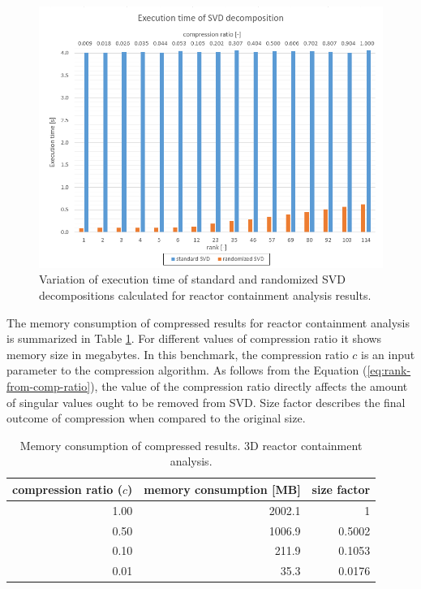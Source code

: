 \begin{figure}[H]
\centering\includegraphics[width=\textwidth]{figures/temelin_ExecutionTime}
\caption{Variation of execution time of standard and randomized SVD decompositions calculated for reactor containment analysis results.}
\label{fig:temelin:ExeTime}
\end{figure}

The memory consumption of compressed results for reactor containment analysis is summarized in Table \ref{tab:mem-consum}. For different values of compression ratio it shows memory size in megabytes. In this benchmark, the compression ratio $c$ is an input parameter to the compression algorithm. As follows from the Equation (\ref{eq:rank-from-comp-ratio}), the value of the compression ratio directly affects the amount of singular values ought to be removed from SVD. Size factor describes the final outcome of compression when compared to the original size.

\begin{table}[H]
\centering
    \begin{tabular}{| r | r | r |}
    \hline
    compression ratio ($c$) & memory consumption [MB] & size factor \\ \hline \hline
    1.00 & 2002.1 & 1 \\ \hline
    0.50 & 1006.9 & 0.5002 \\ \hline
    0.10& 211.9 & 0.1053 \\ \hline
    0.01 & 35.3 & 0.0176 \\ \hline
    \end{tabular}
    \caption{Memory consumption of compressed results. 3D reactor containment analysis.}
	\label{tab:mem-consum}
\end{table}
